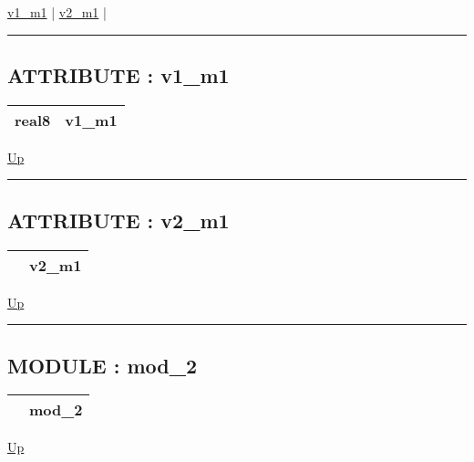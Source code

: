 \hyperlink{ecldoc:intest.example_2.mod_1.v1_m1}{v1\_m1}  |
\hyperlink{ecldoc:intest.example_2.mod_1.v2_m1}{v2\_m1}  |

\rule{\textwidth}{0.4pt}

\subsection*{ATTRIBUTE : v1\_m1}
\hypertarget{ecldoc:intest.example_2.mod_1.v1_m1}{}

{\renewcommand{\arraystretch}{1.5}
\begin{tabularx}{\textwidth}{|>{\raggedright\arraybackslash}l|X|}
\hline
\hspace{0pt}real8 & v1\_m1 \\
\hline
\end{tabularx}
}

\hyperlink{ecldoc:intest.example_2.mod_1}{Up}

\par


\rule{\textwidth}{0.4pt}
\subsection*{ATTRIBUTE : v2\_m1}
\hypertarget{ecldoc:intest.example_2.mod_1.v2_m1}{}

{\renewcommand{\arraystretch}{1.5}
\begin{tabularx}{\textwidth}{|>{\raggedright\arraybackslash}l|X|}
\hline
\hspace{0pt} & v2\_m1 \\
\hline
\end{tabularx}
}

\hyperlink{ecldoc:intest.example_2.mod_1}{Up}

\par


\rule{\textwidth}{0.4pt}


\subsection*{MODULE : mod\_2}
\hypertarget{ecldoc:intest.example_2.mod_2}{}

{\renewcommand{\arraystretch}{1.5}
\begin{tabularx}{\textwidth}{|>{\raggedright\arraybackslash}l|X|}
\hline
\hspace{0pt} & mod\_2 \\
\hline
\end{tabularx}
}

\hyperlink{ecldoc:intest.example_2}{Up}

